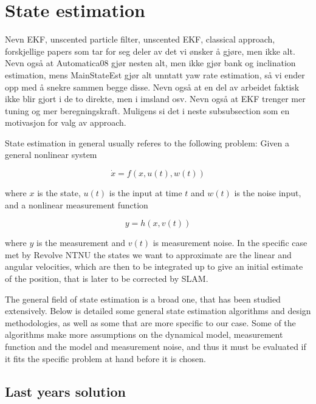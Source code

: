 \section{State estimation}
Nevn EKF, unscented particle filter, unscented EKF, classical approach, forskjellige papers som tar for seg deler av det vi ønsker å gjøre, men ikke alt. Nevn også at Automatica08 gjør nesten alt, men ikke gjør bank og inclination estimation, mens MainStateEst gjør alt unntatt yaw rate estimation, så vi ender opp med å snekre sammen begge disse. Nevn også at en del av arbeidet faktisk ikke blir gjort i de to direkte, men i imsland osv. Nevn også at EKF trenger mer tuning og mer beregningskraft. Muligens si det i neste subsubsection som en motivasjon for valg av approach. 

State estimation in general usually referes to the following problem: Given a general nonlinear system 

\begin{equation}
    \Dot{x} = f(x,u(t), w(t))
\end{equation}

where $x$ is the state, $u(t)$ is the input at time $t$ and $w(t)$ is the noise input, and a nonlinear measurement function

\begin{equation}
    y = h(x,v(t))
\end{equation}

where $y$ is the measurement and $v(t)$ is measurement noise. In the specific case met by Revolve NTNU the states we want to approximate are the linear and angular velocities, which are then to be integrated up to give an initial estimate of the position, that is later to be corrected by SLAM.

The general field of state estimation is a broad one, that has been studied extensively. Below is detailed some general state estimation algorithms and design methodologies, as well as some that are more specific to our case. Some of the algorithms make more assumptions on the dynamical model, measurement function and the model and measurement noise, and thus it must be evaluated if it fits the specific problem at hand before it is chosen. 

\subsection{Last years solution}

